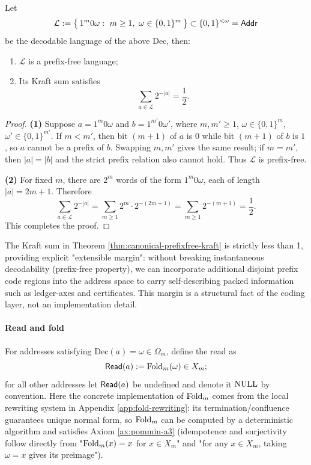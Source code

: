 \begin{theorem}\label{thm:canonical-prefixfree-kraft}
Let
$$
\mathcal{L}:=\bigl\{\,1^m0\omega:\ m\ge 1,\ \omega\in\{0,1\}^m\,\bigr\}\subset \{0,1\}^{<\omega}=\Addr
$$
be the decodable language of the above $\mathrm{Dec}$, then:
\begin{enumerate}
  \item $\mathcal{L}$ is a prefix-free language;
  \item Its Kraft sum satisfies
  $$
  \sum_{a\in\mathcal{L}}2^{-|a|}=\frac12.
  $$
\end{enumerate}
\end{theorem}

\begin{proof}
\textbf{(1)} Suppose $a=1^{m}0\omega$ and $b=1^{m'}0\omega'$, where $m,m'\ge 1$, $\omega\in\{0,1\}^{m}$, $\omega'\in\{0,1\}^{m'}$. If $m<m'$, then bit $(m+1)$ of $a$ is $0$ while bit $(m+1)$ of $b$ is $1$, so $a$ cannot be a prefix of $b$. Swapping $m,m'$ gives the same result; if $m=m'$, then $|a|=|b|$ and the strict prefix relation also cannot hold. Thus $\mathcal{L}$ is prefix-free.\par
\textbf{(2)} For fixed $m$, there are $2^{m}$ words of the form $1^{m}0\omega$, each of length $|a|=2m+1$. Therefore
$$
\sum_{a\in\mathcal{L}}2^{-|a|}
=\sum_{m\ge 1}2^{m}\cdot 2^{-(2m+1)}
=\sum_{m\ge 1}2^{-(m+1)}
=\frac12.
$$
This completes the proof.\par
\end{proof}

\begin{remark}
The Kraft sum in Theorem \ref{thm:canonical-prefixfree-kraft} is strictly less than 1, providing explicit "extensible margin": without breaking instantaneous decodability (prefix-free property), we can incorporate additional disjoint prefix code regions into the address space to carry self-describing packed information such as ledger-axes and certificates. This margin is a structural fact of the coding layer, not an implementation detail.\par
\end{remark}

\paragraph{Read and fold}
For addresses satisfying $\mathrm{Dec}(a)=\omega\in\Omega_m$, define the read as
$$
\mathsf{Read}(a):=\mathrm{Fold}_m(\omega)\in X_m;
$$
for all other addresses let $\mathsf{Read}(a)$ be undefined and denote it $\mathrm{NULL}$ by convention. Here the concrete implementation of $\mathrm{Fold}_m$ comes from the local rewriting system in Appendix \ref{app:fold-rewriting}: its termination/confluence guarantees unique normal form, so $\mathrm{Fold}_m$ can be computed by a deterministic algorithm and satisfies Axiom \ref{ax:pommin-a3} (idempotence and surjectivity follow directly from "$\mathrm{Fold}_m(x)=x$ for $x\in X_m$" and "for any $x\in X_m$, taking $\omega=x$ gives its preimage").\par

